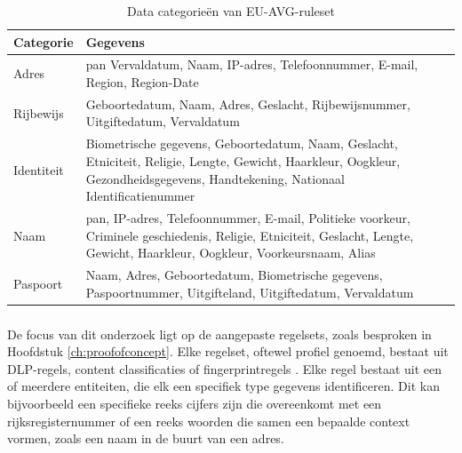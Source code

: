 \begin{table}[h]
    \centering
    \small
    \begin{tabular}{p{5cm}p{10cm}}
    \toprule
    \textbf{Categorie} & \textbf{Gegevens} \\
    \midrule
    Adres & \gls{pan} Vervaldatum, Naam, IP-adres, Telefoonnummer, E-mail, Region, Region-Date \\
    Rijbewijs & Geboortedatum, Naam, Adres, Geslacht, Rijbewijsnummer, Uitgiftedatum, Vervaldatum \\
    Identiteit & Biometrische gegevens, Geboortedatum, Naam, Geslacht, Etniciteit, Religie, Lengte, Gewicht, Haarkleur, Oogkleur, Gezondheidsgegevens, Handtekening, Nationaal Identificatienummer \\
    Naam & \gls{pan}, IP-adres, Telefoonnummer, E-mail, Politieke voorkeur, Criminele geschiedenis, Religie, Etniciteit, Geslacht, Lengte, Gewicht, Haarkleur, Oogkleur, Voorkeursnaam, Alias \\
    Paspoort & Naam, Adres, Geboortedatum, Biometrische gegevens, Paspoortnummer, Uitgifteland, Uitgiftedatum, Vervaldatum \\
    \bottomrule
    \end{tabular}
    \caption{Data categorieën van EU-AVG-ruleset \autocite{Netskope2023GDPR}}
    \label{tab:EU-AVG Netskope}
\end{table}

\subsubsection{}
\label{subsubsec:aangepaste-regels-literatuurstudie}

De focus van dit onderzoek ligt op de aangepaste regelsets, zoals besproken in Hoofdstuk \ref{ch:proofofconcept}. 
Elke regelset, oftewel profiel genoemd, bestaat uit DLP-regels, content classificaties of fingerprintregels \autocite{Netskope2025CreateProfiles}.
Elke regel bestaat uit een of meerdere entiteiten, die elk een specifiek type gegevens identificeren. 
Dit kan bijvoorbeeld een specifieke reeks cijfers zijn die overeenkomt met een rijksregisternummer of een reeks woorden die samen een bepaalde context vormen, zoals een naam in de buurt van een adres. 

\subsection{}
\label{subsec:entiteit-literatuurstudie}

